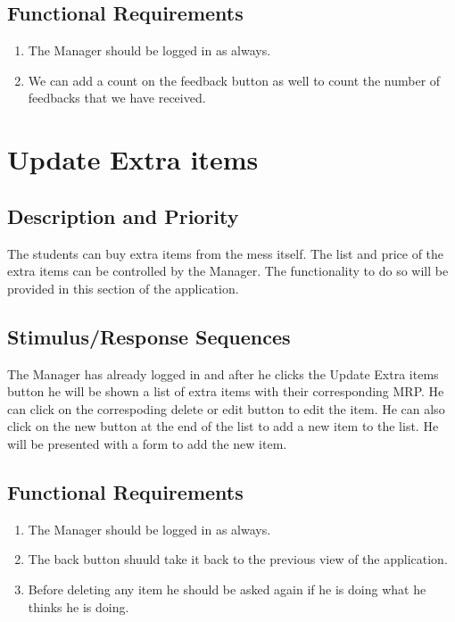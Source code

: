 \documentclass{scrreprt}
\begin{document}
\subsection{Functional Requirements}
\begin{enumerate}
    \item The Manager should be logged in as always.
    \item We can add a count on the feedback button as well to count the number of feedbacks that we have received.
\end{enumerate}

\section{Update Extra items}

\subsection{Description and Priority}
The students can buy extra items from the mess itself. The list and price of the extra items can be controlled by the Manager. The functionality to do so will be provided in this section of the application.

\subsection{Stimulus/Response Sequences}
The Manager has already logged in and after he clicks the Update Extra items button he will be shown a list of extra items with their corresponding MRP. He can click on the correspoding delete or edit button to edit the item. He can also click on the new button at the end of the list to add a new item to the list. He will be presented with a form to add the new item.

\subsection{Functional Requirements}
\begin{enumerate}
    \item The Manager should be logged in as always.
    \item The back button shuuld take it back to the previous view of the application.
    \item Before deleting any item he should be asked again if he is doing what he thinks he is doing.
\end{enumerate}
\end{document}

